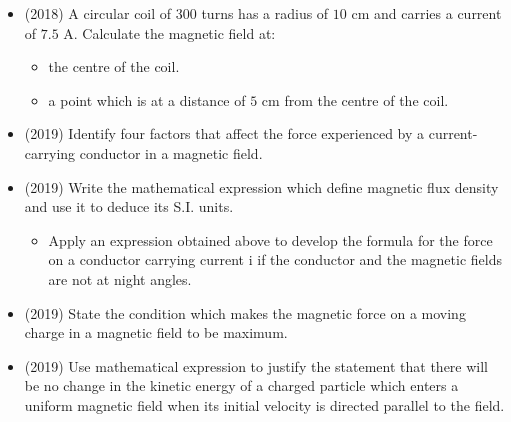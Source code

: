\documentclass{article}
\begin{document}
\begin{itemize}
\item (2018)  A circular coil of $ 300$ turns has a radius of $ 10$ cm and carries a current of $ 7.5$ A. Calculate the magnetic field at:
 \begin{itemize}
\item the centre of the coil. 
\item a point which is at a distance of $ 5$ cm from the centre of the coil. 
\end{itemize}
\item (2019)  Identify four factors that affect the force experienced by a current-carrying conductor in a magnetic field. 
\item (2019)  Write the mathematical expression which define magnetic flux density and use it to deduce its S.I. units. 
 \begin{itemize}
\item Apply an expression obtained above to develop the formula for the force on a conductor carrying current i if the conductor and the magnetic fields are not at night angles.
\end{itemize}
\item (2019)  State the condition which makes the magnetic force on a moving charge in a magnetic field to be maximum. 
\item (2019)  Use mathematical expression to justify the statement that there will be no change in the kinetic energy of a charged particle which enters a uniform magnetic field when its initial velocity is directed parallel to the field.
\end{itemize}
\end{document}
